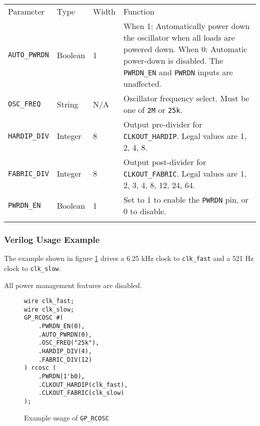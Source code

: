 \documentclass[11pt]{article}
\newcommand{\tokenstyle}[1]{\texttt{#1}}
\newcommand{\wirestyle}[1]{\texttt{#1}}
\newcommand{\valuestyle}[1]{\texttt{#1}}
\newcommand{\strvaluestyle}[1]{\valuestyle{\textquotedbl#1\textquotedbl}}
\newcommand{\whenstyle}[1]{{\fontseries{sb}\selectfont#1}}
\newcommand{\thinhline}{\Xhline{1\arrayrulewidth}}
\newcommand{\thickhline}{\Xhline{2.5\arrayrulewidth}}
\begin{document}
\begin{tabularx}{\textwidth}{lllX}
\thinhline
\whenstyle{Parameter} & \whenstyle{Type} & \whenstyle{Width} & \whenstyle{Function} \\
\thickhline
\tokenstyle{AUTO\_PWRDN} & Boolean & 1 &
	\whenstyle{When 1:} Automatically power down the oscillator when all loads are powered down. \newline
	\whenstyle{When 0:} Automatic power-down is disabled. The \tokenstyle{PWRDN\_EN} and \tokenstyle{PWRDN} inputs are unaffected.\\
\thinhline
\tokenstyle{OSC\_FREQ} & String & N/A & Oscillator frequency select. Must be one of \strvaluestyle{2M} or \strvaluestyle{25k}. \\
\thinhline
\tokenstyle{HARDIP\_DIV} & Integer & 8 &
	Output pre-divider for \tokenstyle{CLKOUT\_HARDIP}. Legal values are 1, 2, 4, 8. \\
\thinhline
\tokenstyle{FABRIC\_DIV} & Integer & 8 &
	Output post-divider for \tokenstyle{CLKOUT\_FABRIC}. Legal values are 1, 2, 3, 4, 8, 12, 24, 64. \\
\thinhline
\tokenstyle{PWRDN\_EN} & Boolean & 1 & Set to 1 to enable the \tokenstyle{PWRDN} pin, or 0 to disable. \\
\thinhline
\end{tabularx}

\pagebreak
\subsubsection{Verilog Usage Example}

The example shown in figure \ref{gp-rcosc-example} drives a 6.25 kHz clock to \wirestyle{clk\_fast} and a 521 Hz clock to
\wirestyle{clk\_slow}.

All power management features are disabled.

\begin{figure}[h]
\begin{lstlisting}
wire clk_fast;
wire clk_slow;
GP_RCOSC #(
	.PWRDN_EN(0),
	.AUTO_PWRDN(0),
	.OSC_FREQ("25k"),
	.HARDIP_DIV(4),
	.FABRIC_DIV(12)
) rcosc (
	.PWRDN(1'b0),
	.CLKOUT_HARDIP(clk_fast),
	.CLKOUT_FABRIC(clk_slow)
);
\end{lstlisting}
\caption{Example usage of \tokenstyle{GP\_RCOSC}}
\label{gp-rcosc-example}
\end{figure}

\end{document}
